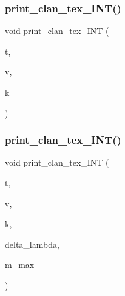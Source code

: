 \subsubsection{\texorpdfstring{print\+\_\+clan\+\_\+tex\+\_\+\+I\+N\+T()}{print\_clan\_tex\_INT()}\hspace{0.1cm}{\footnotesize\ttfamily [1/2]}}
{\footnotesize\ttfamily void print\+\_\+clan\+\_\+tex\+\_\+\+I\+NT (\begin{DoxyParamCaption}\item[{\mbox{\hyperlink{galois_8h_a09fddde158a3a20bd2dcadb609de11dc}{I\+NT}}}]{t,  }\item[{\mbox{\hyperlink{galois_8h_a09fddde158a3a20bd2dcadb609de11dc}{I\+NT}}}]{v,  }\item[{\mbox{\hyperlink{galois_8h_a09fddde158a3a20bd2dcadb609de11dc}{I\+NT}}}]{k }\end{DoxyParamCaption})}

\mbox{\label{_l_i_b_2_d_i_s_c_r_e_t_a_2design_8_c_a113113716b2c49918c3f7182040c80b6}} 
\subsubsection{\texorpdfstring{print\+\_\+clan\+\_\+tex\+\_\+\+I\+N\+T()}{print\_clan\_tex\_INT()}\hspace{0.1cm}{\footnotesize\ttfamily [2/2]}}
{\footnotesize\ttfamily void print\+\_\+clan\+\_\+tex\+\_\+\+I\+NT (\begin{DoxyParamCaption}\item[{\mbox{\hyperlink{galois_8h_a09fddde158a3a20bd2dcadb609de11dc}{I\+NT}}}]{t,  }\item[{\mbox{\hyperlink{galois_8h_a09fddde158a3a20bd2dcadb609de11dc}{I\+NT}}}]{v,  }\item[{\mbox{\hyperlink{galois_8h_a09fddde158a3a20bd2dcadb609de11dc}{I\+NT}}}]{k,  }\item[{\mbox{\hyperlink{galois_8h_a09fddde158a3a20bd2dcadb609de11dc}{I\+NT}}}]{delta\+\_\+lambda,  }\item[{\mbox{\hyperlink{classdiscreta__base}{discreta\+\_\+base}} \&}]{m\+\_\+max }\end{DoxyParamCaption})}

